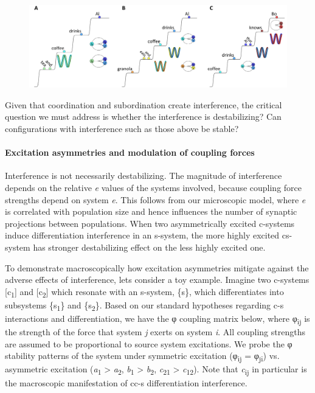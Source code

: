   
\begin{figure}
\includegraphics[width=\textwidth]{figures/Tilsen-img94.png}
\caption{\missingcaption}
\label{fig:}
\end{figure}
 

  Given that coordination and subordination create interference, the critical question we must address is whether the interference is destabilizing? Can configurations with interference such as those above be stable? 

\paragraph{Excitation asymmetries and modulation of coupling forces}

Interference is not necessarily destabilizing. The magnitude of interference depends on the relative \textit{e} values of the systems involved, because coupling force strengths depend on system \textit{e}. This follows from our microscopic model, where \textit{e} is correlated with population size and hence influences the number of synaptic projections between populations. When two asymmetrically excited c-systems induce differentiation interference in an s-system, the more highly excited cs-system has stronger destabilizing effect on the less highly excited one.

  To demonstrate macroscopically how excitation asymmetries mitigate against the adverse effects of interference, lets consider a toy example. Imagine two c-systems [c\textsubscript{1}] and [c\textsubscript{2}] which resonate with an s-system, \{s\}, which differentiates into subsystems \{s\textsubscript{1}\} and \{s\textsubscript{2}\}. Based on our standard hypotheses regarding c-s interactions and differentiation, we have the φ coupling matrix below, where φ\textsubscript{ij} is the strength of the force that system \textit{j} exerts on system \textit{i}. All coupling strengths are assumed to be proportional to source system excitations. We probe the φ stability patterns of the system under symmetric excitation (φ\textsubscript{ij} = φ\textsubscript{ji}) vs. asymmetric excitation (\textit{a}\textsubscript{1} > \textit{a}\textsubscript{2}, \textit{b}\textsubscript{1} > \textit{b}\textsubscript{2}, \textit{c}\textsubscript{21} > \textit{c}\textsubscript{12}). Note that \textit{c}\textsubscript{ij} in particular is the macroscopic manifestation of cc-s differentiation interference.


